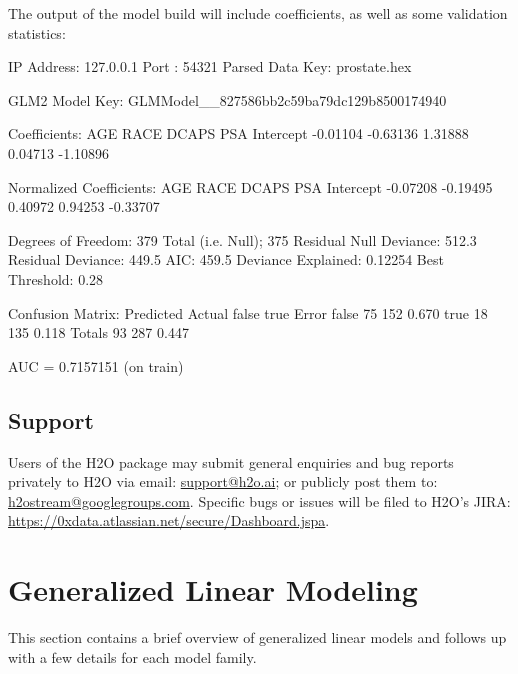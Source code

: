 \documentclass[11pt]{article}
\begin{document}
\vspace{10 mm}
\noindent
The output of the model build will include coefficients, as well as some validation statistics:

\begin{spverbatim}       
IP Address: 127.0.0.1 
Port      : 54321 
Parsed Data Key: prostate.hex 

GLM2 Model Key: GLMModel__827586bb2c59ba79dc129b8500174940

Coefficients:
      AGE      RACE     DCAPS       PSA Intercept 
 -0.01104  -0.63136   1.31888   0.04713  -1.10896 

Normalized Coefficients:
      AGE      RACE     DCAPS       PSA Intercept 
 -0.07208  -0.19495   0.40972   0.94253  -0.33707 

Degrees of Freedom: 379 Total (i.e. Null);  375 Residual
Null Deviance:     512.3
Residual Deviance: 449.5  AIC: 459.5
Deviance Explained: 0.12254 
 Best Threshold: 0.28

Confusion Matrix:
        Predicted
Actual   false true Error
  false     75  152 0.670
  true      18  135 0.118
  Totals    93  287 0.447

AUC =  0.7157151 (on train)
\end{spverbatim}

\subsection{Support} 

Users of the H2O package may submit general enquiries and bug reports privately to H2O via email: \url {support@h2o.ai}; or publicly post them to: \url {h2ostream@googlegroups.com}. Specific bugs or issues will be filed to H2O's JIRA: 
\url{https://0xdata.atlassian.net/secure/Dashboard.jspa}.

\section{Generalized Linear Modeling} 
This section contains a brief overview of generalized linear models and follows up with a few details for each model family.
\end{document}
